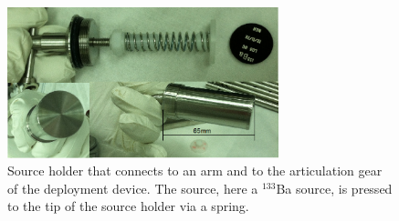 \begin{figure}[htbp]
 \centering
  \includegraphics[width=0.7\textwidth]{Figures/SourceHolder.png}
  \caption{Source holder that connects to an arm and to the articulation gear of the deployment device. The source, here a $^{133}$Ba source, is pressed to the tip of the source holder via a spring.}
  \label{fig:SourceHolder}
\end{figure}